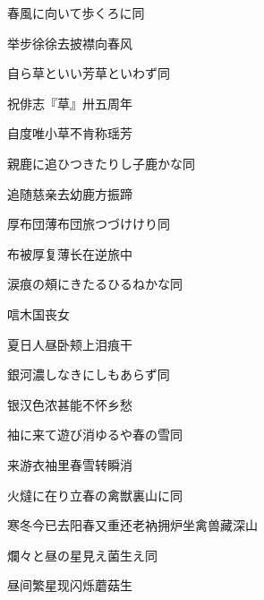 \begin{haiku}
    {\FH 春風に向いて歩くろに}\hfill{\FH 同}

    {\FK 举步徐徐去披襟向春风}
\end{haiku}

\begin{haiku}
    {\FH 自ら草といい芳草といわず}\hfill{\FH 同}

    {\FK 祝俳志『草』卅五周年}

    {\FK 自度唯小草不肯称瑶芳}
\end{haiku}

\begin{haiku}
    {\FH 親鹿に追ひつきたりし子鹿かな}\hfill{\FH 同}

    {\FK 追随慈亲去幼鹿方振蹄}
\end{haiku}

\begin{haiku}
    {\FH 厚布団薄布団旅つづけけり}\hfill{\FH 同}

    {\FK 布被厚复薄长在逆旅中}
\end{haiku}

\begin{haiku}
    {\FH 涙痕の頰にきたるひるねかな}\hfill{\FH 同}

    {\FK 唁木国丧女}

    {\FK 夏日人昼卧颊上泪痕干}
\end{haiku}

\begin{haiku}
    {\FH 銀河濃しなきにしもあらず}\hfill{\FH 同}

    {\FK 银汉色浓甚能不怀乡愁}
\end{haiku}

\begin{haiku}
    {\FH 袖に来て遊び消ゆるや春の雪}\hfill{\FH 同}

    {\FK 来游衣袖里春雪转瞬消}
\end{haiku}

\begin{haiku}
    {\FH {}火燵に在り立春の禽獣裏山に}\hfill{\FH 同}

    {\FK 寒冬今已去阳春又重还老衲拥炉坐禽兽藏深山}
\end{haiku}

\begin{haiku}
    {\FH 爛々と昼の星見え菌生え}\hfill{\FH 同}

    {\FK 昼间繁星现闪烁蘑菇生}
\end{haiku}

